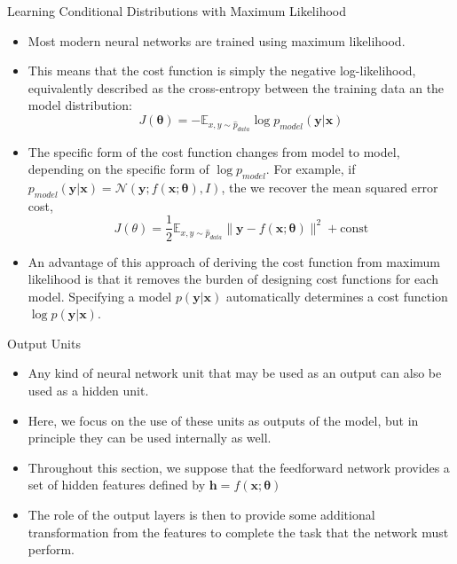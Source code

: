 \documentclass[10pt]{beamer}
\begin{document}
	\begin{frame}{Learning Conditional Distributions with Maximum Likelihood}
		\begin{itemize}
			\item Most modern neural networks are trained using maximum likelihood.
			\pause
			\item This means that the cost function is simply the negative log-likelihood, equivalently described as the cross-entropy between the training data an the model distribution:
			$$J(\bm{\theta})=-\mathbb{E}_{x,y\sim\hat{p}_{data}}\log p_{model}(\bm{y}|\bm{x})$$

			\pause
			\item The specific form of the cost function changes from model to model, depending on the specific form of $\log p_{model}$. For example, if $p_{model}(\bm{y}|\bm{x})=\mathcal{N}(\bm{y};f(\bm{x};\bm{\theta}),\mathit{I})$, the we recover the mean squared error cost,
			$$J(\theta)=\frac{1}{2}\mathbb{E}_{x,y\sim\hat{p}_{data}}\lVert\bm{y}-f(\bm{x};\bm{\theta})\rVert^2+\text{const}$$

			\pause
			\item An advantage of this approach of deriving the cost function from maximum likelihood is that it removes the burden of designing cost functions for each model. Specifying a model $p(\bm{y}|\bm{x})$ automatically determines a cost function $\log p(\bm{y}|\bm{x})$.
		\end{itemize}
	\end{frame}
	
	\begin{frame}{Output Units}
		\begin{itemize}
			\item Any kind of neural network unit that may be used as an output can also be used as a hidden unit.
			\pause
			\item Here, we focus on the use of these units as outputs of the model, but in principle they can be used internally as well.
			\pause
			\item Throughout this section, we suppose that the feedforward network provides a set of hidden features defined by $\bm{h}=f(\bm{x};\bm{\theta})$
			\pause
			\item The role of the output layers is then to provide some additional transformation from the features to complete the task that the network must perform.
		\end{itemize}
	\end{frame}
\end{document}
